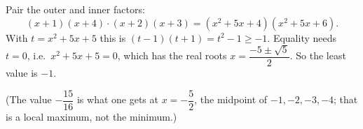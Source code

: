Pair the outer and inner factors:
\[
(x+1)(x+4)\cdot(x+2)(x+3)=(x^2+5x+4)(x^2+5x+6).
\]
With $t=x^2+5x+5$ this is $(t-1)(t+1)=t^2-1\ge-1$. Equality needs $t=0$, i.e.\ $x^2+5x+5=0$, which has the real roots $x=\dfrac{-5\pm\sqrt5}{2}$. So the least value is $\boxed{-1}$.

(The value $-\dfrac{15}{16}$ is what one gets at $x=-\dfrac{5}{2}$, the midpoint of $-1,-2,-3,-4$; that is a local maximum, not the minimum.)
